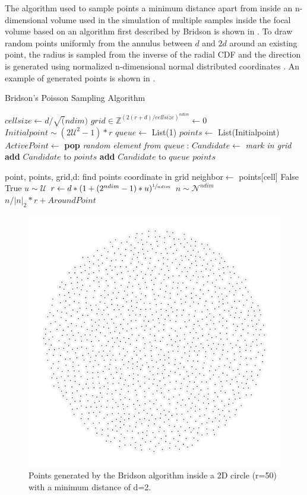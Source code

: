 The algorithm used to sample points a minimum distance apart from inside an n-dimensional volume used in the simulation of multiple samples inside the focal volume based on an algorithm first described by Bridson is shown in  \cite{bridson}. To draw random points uniformly from the annulus between $d$ and $2d$ around an existing point, the radius is sampled from the inverse of the radial CDF and the direction is generated using normalized n-dimensional normal distributed coordinates \cite{muller1959}.
An example of generated points is shown in .
\begin{algorithm}
	\caption{Bridson's Poisson Sampling Algorithm}\label{algo:bridson}
	\begin{algorithmic}
			\State $cellsize \gets d / \sqrt(ndim)$
			\State $grid \in \mathbb{Z}^{{{(2(r+d)/cellsize)}^{ndim}}} \gets 0$
			\State $Initialpoint \sim (2\mathcal{U}^2-1)*r$
			\State $queue \gets$ List(1)
			\State $points \gets$ List(Initialpoint)
				\State $ActivePoint \gets$ \textbf{pop} \textit{random element from queue}
				:
					\State $Candidate \gets$
						\State \textit{mark in grid}
						\State \textbf{add} $Candidate$ to $points$
						\State \textbf{add} $Candidate$ to $queue$
					\EndIf
				\EndLoop
			\EndWhile
			\State \Return $points$
		\EndFunction
		
		 {point, points, grid,d}:
			\State find points coordinate in grid
					\State neighbor$\gets$ points[cell]
					 	\State \Return False 
					 \EndIf
				\EndIf
			\EndFor
			\State \Return True
		\EndFunction
			\State $u \sim \mathcal{U}$
			\State $r \gets d * (1 + (2 ^ {ndim} - 1) * u) ^ {\sfrac{1}{ndim}}$
			\State $n \sim \mathcal{N}^{ndim}$
			\State \Return  $n/|n|_2 * r + AroundPoint$
		\EndFunction
	\end{algorithmic}
\end{algorithm}

\begin{figure}[H]
	\centering
	\includegraphics[width=0.4\linewidth]{images/bridson.pdf}
	\caption{Points generated by the Bridson algorithm inside a 2D circle (r=50) with a minimum distance of d=2.}
	\label{fig:bridson}
\end{figure}

